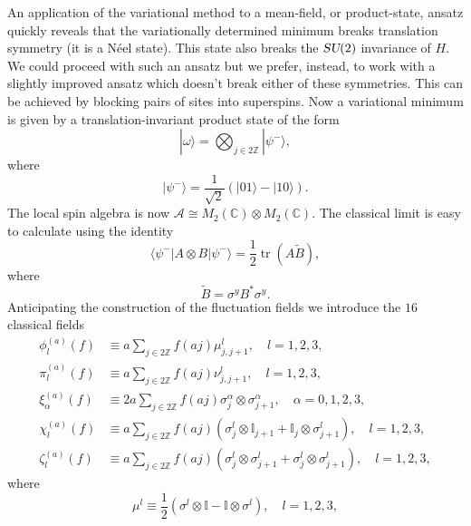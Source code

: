 \documentclass[prl,twocolumn,lengthcheck,superscriptaddress]{revtex4-1}
\newcommand{\tr}{\operatorname{tr}}
\theoremstyle{definition}
\theoremstyle{remark}
\begin{document}
An application of the variational method to a mean-field, or product-state, ansatz quickly reveals that the variationally determined minimum breaks translation symmetry (it is a N\'eel state). This state also breaks the $\textsl{SU}(2)$ invariance of $H$. We could proceed with such an ansatz but we prefer, instead, to work with a slightly improved ansatz which doesn't break either of these symmetries. This can be achieved by blocking pairs of sites into superspins. Now a variational minimum is given by a translation-invariant product state of the form
\begin{equation}
	|\omega\rangle = \bigotimes_{j\in 2\mathbb{Z}} |\psi^{-}\rangle,
\end{equation}
where
\begin{equation}
	|\psi^{-}\rangle = \frac{1}{\sqrt{2}} (|01\rangle -|10\rangle).
\end{equation}
The local spin algebra is now $\mathcal{A}\cong M_2(\mathbb{C})\otimes M_2(\mathbb{C})$. The classical limit is easy to calculate using the identity
\begin{equation}
	\langle \psi^{-}|A\otimes B|\psi^{-}\rangle = \frac12\tr(A \widetilde{B}), 
\end{equation}
where 
\begin{equation}
	\widetilde{B} = \sigma^y B^{*} \sigma^y.
\end{equation}
Anticipating the construction of the fluctuation fields we introduce the $16$ classical fields
\begin{equation}
	\begin{split}
	\phi_l^{(a)}(f) &\equiv a\sum_{j\in 2\mathbb{Z}} f(aj) \mu^l_{j,j+1}, \quad l = 1,2,3,\\
	\pi_l^{(a)}(f) &\equiv a\sum_{j\in 2\mathbb{Z}} f(aj)  \nu^l_{j,j+1}, \quad l = 1,2,3, \\
	\xi_\alpha^{(a)}(f) &\equiv 2a\sum_{j\in 2\mathbb{Z}} f(aj) \sigma^{\alpha}_j\otimes \sigma^{\alpha}_{j+1},\quad \alpha = 0,1,2,3, \\
	\chi_l^{(a)}(f)&\equiv a\sum_{j\in 2\mathbb{Z}} f(aj) (\sigma^{l}_j\otimes \mathbb{I}_{j+1}+\mathbb{I}_{j}\otimes \sigma^{l}_{j+1}), \quad l = 1,2,3,\\
	\zeta_l^{(a)}(f) &\equiv a\sum_{j\in 2\mathbb{Z}} f(aj) (\sigma^{l}_j\otimes \sigma^{l}_{j+1}+\sigma^{l}_{j}\otimes \sigma^{l}_{j+1}), \quad l = 1,2,3, 
	\end{split}
\end{equation}
where 
\begin{equation}
	\mu^l \equiv \frac{1}{2}(\sigma^{l}\otimes \mathbb{I}-\mathbb{I}\otimes \sigma^{l}), \quad l = 1, 2,3,
\end{equation}
\end{document}
